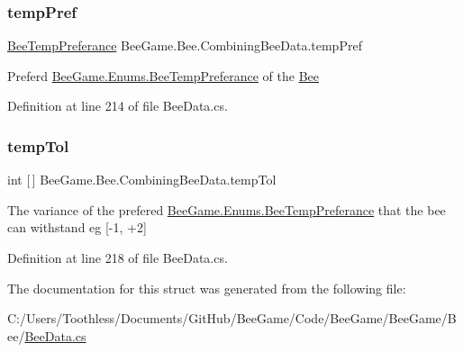 \mbox{\label{struct_bee_game_1_1_bee_1_1_combining_bee_data_a93f8cb5caf0b68dd597da1b3ab9e27b5}} 
\subsubsection{\texorpdfstring{temp\+Pref}{tempPref}}
{\footnotesize\ttfamily \hyperlink{namespace_bee_game_1_1_enums_a9db0f9ac859fab168654d657f248b024}{Bee\+Temp\+Preferance} Bee\+Game.\+Bee.\+Combining\+Bee\+Data.\+temp\+Pref}



Preferd \hyperlink{namespace_bee_game_1_1_enums_a9db0f9ac859fab168654d657f248b024}{Bee\+Game.\+Enums.\+Bee\+Temp\+Preferance} of the \hyperlink{namespace_bee_game_1_1_bee}{Bee} 



Definition at line 214 of file Bee\+Data.\+cs.

\mbox{\label{struct_bee_game_1_1_bee_1_1_combining_bee_data_a31cebfaca3139379e30a43fa0ac7e338}} 
\subsubsection{\texorpdfstring{temp\+Tol}{tempTol}}
{\footnotesize\ttfamily int \mbox{[}$\,$\mbox{]} Bee\+Game.\+Bee.\+Combining\+Bee\+Data.\+temp\+Tol}



The variance of the prefered \hyperlink{namespace_bee_game_1_1_enums_a9db0f9ac859fab168654d657f248b024}{Bee\+Game.\+Enums.\+Bee\+Temp\+Preferance} that the bee can withstand eg \mbox{[}-\/1, +2\mbox{]} 



Definition at line 218 of file Bee\+Data.\+cs.



The documentation for this struct was generated from the following file\+:\begin{DoxyCompactItemize}
\item 
C\+:/\+Users/\+Toothless/\+Documents/\+Git\+Hub/\+Bee\+Game/\+Code/\+Bee\+Game/\+Bee\+Game/\+Bee/\hyperlink{_bee_data_8cs}{Bee\+Data.\+cs}\end{DoxyCompactItemize}
